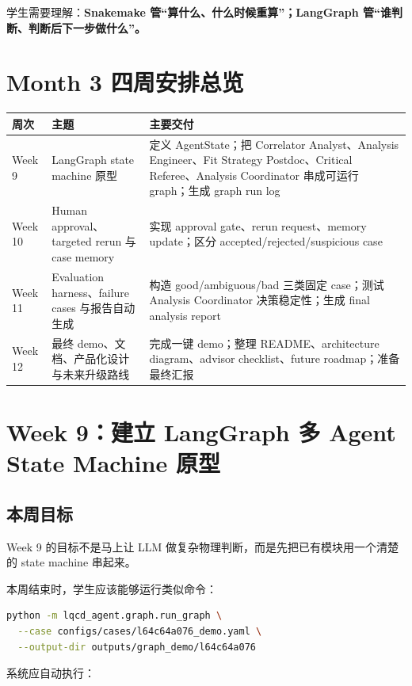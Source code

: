 \documentclass[11pt,a4paper,fontset=none]{ctexart}
\begin{document}
学生需要理解：\textbf{Snakemake 管“算什么、什么时候重算”；LangGraph 管“谁判断、判断后下一步做什么”。}

\section{Month 3 四周安排总览}

\begin{longtable}{p{}p{}p{}}
\toprule
周次 & 主题 & 主要交付 \\
\midrule
Week 9 & LangGraph state machine 原型 & 定义 AgentState；把 Correlator Analyst、Analysis Engineer、Fit Strategy Postdoc、Critical Referee、Analysis Coordinator 串成可运行 graph；生成 graph run log \\
Week 10 & Human approval、targeted rerun 与 case memory & 实现 approval gate、rerun request、memory update；区分 accepted/rejected/suspicious case \\
Week 11 & Evaluation harness、failure cases 与报告自动生成 & 构造 good/ambiguous/bad 三类固定 case；测试 Analysis Coordinator 决策稳定性；生成 final analysis report \\
Week 12 & 最终 demo、文档、产品化设计与未来升级路线 & 完成一键 demo；整理 README、architecture diagram、advisor checklist、future roadmap；准备最终汇报 \\
\bottomrule
\end{longtable}

\section{Week 9：建立 LangGraph 多 Agent State Machine 原型}

\subsection{本周目标}

Week 9 的目标不是马上让 LLM 做复杂物理判断，而是先把已有模块用一个清楚的 state machine 串起来。

本周结束时，学生应该能够运行类似命令：

\begin{lstlisting}[language=bash]
python -m lqcd_agent.graph.run_graph \
  --case configs/cases/l64c64a076_demo.yaml \
  --output-dir outputs/graph_demo/l64c64a076
\end{lstlisting}

系统应自动执行：
\end{document}
